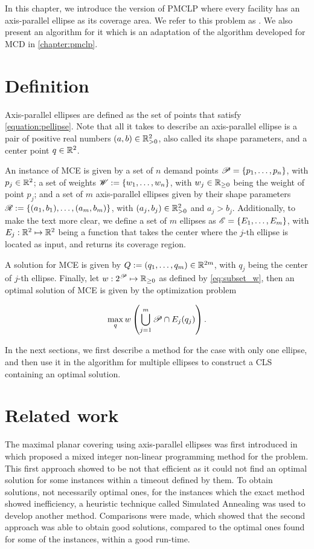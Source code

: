In this chapter, we introduce the version of PMCLP where every 
facility has an axis-parallel ellipse as its coverage area. We refer to this problem as . We also present an algorithm for it which is an adaptation of the algorithm developed for MCD in \autoref{chapter:pmclp}.

\section{Definition}

Axis-parallel ellipses are defined as the set of points that satisfy \autoref{equation:pellipse}. Note that all it takes to describe an axis-parallel ellipse is a pair of positive real numbers $(a,b) \in \mathbb{R}_{>0}^2$, also called its shape parameters, and a center point $q \in \mathbb{R}^2$.

An instance of MCE is given by a set of $n$ demand points $\mathscr{P} = \{p_1, \dots, p_n\}$, with $p_j\in\mathbb{R}^2$; 
a set of weights $\mathscr{W}:=\{w_1, \dots, w_n\}$, with $w_j\in\mathbb{R}_{\ge0}$ being the weight of point $p_j$;
and a set of $m$ axis-parallel ellipses given by their shape parameters $\mathscr{R}:=\{(a_1, b_1), \dots, (a_m, b_m)\}$, with $(a_j, b_j)\in\mathbb{R}_{>0}^2$ and $a_j>b_j$.
Additionally, to make the text more clear, we define a set of $m$ ellipses as $\mathscr{E} = \{E_1, \dots, E_m\}$, with $E_j : \mathbb{R}^2 \mapsto \mathbb{R}^2$ being a function that takes the center where the $j$-th ellipse is located as input, and returns its coverage region.

A solution for MCE is given by $Q:=(q_1, \dots, q_m)\in\mathbb{R}^{2m}$, with $q_j$ being the center of $j$-th ellipse. Finally, let $w : 2^{\mathscr{P}} \mapsto \mathbb{R}_{\ge0}$ as defined by \autoref{eq:subset_w}, then an optimal solution of MCE is given by the optimization problem

\begin{equation}
\max_q w\left(\bigcup_{j=1}^m \mathscr{P} \cap E_j(q_j)\right).
\end{equation}

In the next sections, we first describe a method for the case with only one ellipse, and then use it in the algorithm for multiple ellipses to construct a CLS containing an optimal solution.

\section{Related work}
The maximal planar covering using axis-parallel ellipses was first introduced in  which proposed a mixed integer non-linear programming method for the problem. This first approach showed to be not that efficient as it could not find an optimal solution for some instances within a timeout defined by them. To obtain solutions, not necessarily optimal ones, for the instances which the exact method showed inefficiency, a heuristic technique called Simulated Annealing was used to develop another method. Comparisons were made, which showed that the second approach was able to obtain good solutions, compared to the optimal ones found for some of the instances, within a good run-time.

